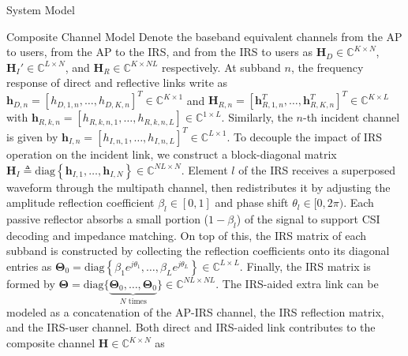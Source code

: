 \documentclass{IEEEtran}
\begin{document}
\begin{section} {System Model}
\begin{subsection}	{Composite Channel Model}
		Denote the baseband equivalent channels from the AP to users, from the AP to the IRS, and from the IRS to users as $\boldsymbol{H}_D \in \mathbb{C}^{K \times N}$, $\boldsymbol{H}_I' \in \mathbb{C}^{L \times N}$, and $\boldsymbol{H}_R \in \mathbb{C}^{K \times NL}$ respectively. At subband $n$, the frequency response of direct and reflective links write as $\boldsymbol{h}_{D,n}=[h_{D,1,n},\dots,h_{D,K,n}]^T \in \mathbb{C}^{K \times 1}$ and $\boldsymbol{H}_{R,n}=[\boldsymbol{h}_{R,1,n}^T,\dots,\boldsymbol{h}_{R,K,n}^T]^T \in \mathbb{C}^{K \times L}$ with $\boldsymbol{h}_{R,k,n}=[h_{R,k,n,1},\dots,h_{R,k,n,L}] \in \mathbb{C}^{1 \times L}$. Similarly, the $n$-th incident channel is given by $\boldsymbol{h}_{I,n}=[h_{I,n,1},\dots,h_{I,n,L}]^T \in \mathbb{C}^{L \times 1}$. To decouple the impact of IRS operation on the incident link, we construct a block-diagonal matrix $\boldsymbol{H}_I \triangleq \text{diag}\left\{\boldsymbol{h}_{I,1},\dots,\boldsymbol{h}_{I,N}\right\} \in \mathbb{C}^{NL \times N}$. Element $l$ of the IRS receives a superposed waveform through the multipath channel, then redistributes it by adjusting the amplitude reflection coefficient $\beta_l \in [0,1]$ and phase shift $\theta_l \in [0,2\pi)$. Each passive reflector absorbs a small portion ($1 - \beta_l$) of the signal to support CSI decoding and impedance matching. On top of this, the IRS matrix of each subband is constructed by collecting the reflection coefficients onto its diagonal entries as $\boldsymbol{\Theta}_0 = \text{diag}\left\{\beta_1 e^{j \theta_1}, \dots, \beta_L e^{j \theta_L}\right\} \in \mathbb{C}^{L \times L}$. Finally, the IRS matrix is formed by $\boldsymbol{\Theta} = \text{diag}\{\underbrace{\boldsymbol{\Theta}_0,\dots,\boldsymbol{\Theta}_0}_{N\text{ times}}\} \in \mathbb{C}^{NL \times NL}$. The IRS-aided extra link can be modeled as a concatenation of the AP-IRS channel, the IRS reflection matrix, and the IRS-user channel. Both direct and IRS-aided link contributes to the composite channel $\boldsymbol{H} \in \mathbb{C}^{K \times N}$ as



\end{subsection}
\end{section}
\end{document}
